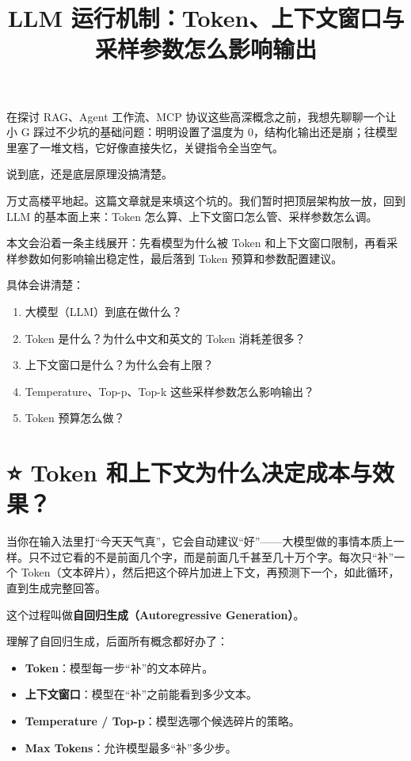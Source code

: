 \documentclass[10pt,a4paper]{ctexart}
\begin{document}
\title{LLM 运行机制：Token、上下文窗口与采样参数怎么影响输出}
\date{}
\maketitle

在探讨 RAG、Agent 工作流、MCP 协议这些高深概念之前，我想先聊聊一个让小 G 踩过不少坑的基础问题：明明设置了温度为 0，结构化输出还是崩；往模型里塞了一堆文档，它好像直接失忆，关键指令全当空气。



说到底，还是底层原理没搞清楚。



万丈高楼平地起。这篇文章就是来填这个坑的。我们暂时把顶层架构放一放，回到 LLM 的基本面上来：Token 怎么算、上下文窗口怎么管、采样参数怎么调。



本文会沿着一条主线展开：先看模型为什么被 Token 和上下文窗口限制，再看采样参数如何影响输出稳定性，最后落到 Token 预算和参数配置建议。



具体会讲清楚：


\begin{enumerate}[itemsep=2pt, topsep=4pt]
  \item 大模型（LLM）到底在做什么？
  \item Token 是什么？为什么中文和英文的 Token 消耗差很多？
  \item 上下文窗口是什么？为什么会有上限？
  \item Temperature、Top-p、Top-k 这些采样参数怎么影响输出？
  \item Token 预算怎么做？
\end{enumerate}


\section{⭐️ Token 和上下文为什么决定成本与效果？}


当你在输入法里打“今天天气真”，它会自动建议“好”——大模型做的事情本质上一样。只不过它看的不是前面几个字，而是前面几千甚至几十万个字。每次只“补”一个 Token（文本碎片），然后把这个碎片加进上下文，再预测下一个，如此循环，直到生成完整回答。



这个过程叫做\textbf{自回归生成（Autoregressive Generation）}。



理解了自回归生成，后面所有概念都好办了：


\begin{itemize}[itemsep=2pt, topsep=4pt]
  \item \textbf{Token}：模型每一步“补”的文本碎片。
  \item \textbf{上下文窗口}：模型在“补”之前能看到多少文本。
  \item \textbf{Temperature / Top-p}：模型选哪个候选碎片的策略。
  \item \textbf{Max Tokens}：允许模型最多“补”多少步。
\end{itemize}
\end{document}
